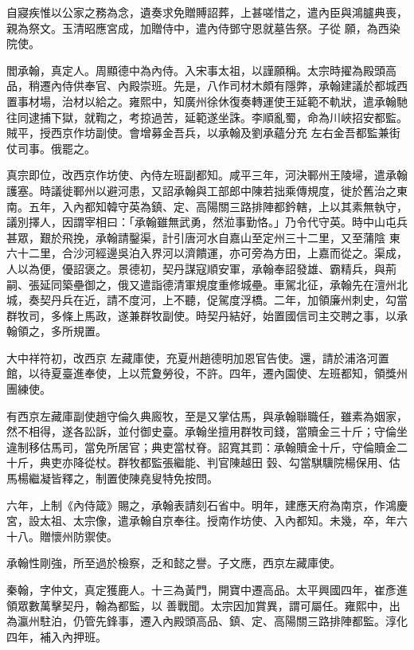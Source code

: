 \begin{pinyinscope}
 自寢疾惟以公家之務為念，遺奏求免贈賻詔葬，上甚嗟惜之，遣內臣與鴻臚典喪，親為祭文。玉清昭應宮成，加贈侍中，遣內侍鄧守恩就墓告祭。子從
 願，為西染院使。



 閻承翰，真定人。周顯德中為內侍。入宋事太祖，以謹願稱。太宗時擢為殿頭高品，稍遷內侍供奉官、內殿崇班。先是，八作司材木頗有隱弊，承翰建議於都城西置事材場，治材以給之。雍熙中，知廣州徐休復奏轉運使王延範不軌狀，遣承翰馳往同逮捕下獄，就鞫之，考掠過苦，延範遂坐誅。李順亂蜀，命為川峽招安都監。賊平，授西京作坊副使。會增募金吾兵，以承翰及劉承蘊分充
 左右金吾都監兼街仗司事。俄罷之。



 真宗即位，改西京作坊使、內侍左班副都知。咸平三年，河決鄆州王陵埽，遣承翰護塞。時議徙鄆州以避河患，又詔承翰與工部郎中陳若拙乘傳規度，徙於舊治之東南。五年，入內都知韓守英為鎮、定、高陽關三路排陣都鈐轄，上以其素無執守，議別擇人，因謂宰相曰：「承翰雖無武勇，然涖事勤恪。」乃令代守英。時中山屯兵甚眾，艱於飛挽，承翰請鑿渠，計引唐河水自嘉山至定州三十二里，又至蒲陰
 東六十二里，合沙河經邊吳泊入界河以濟饋運，亦可旁為方田，上嘉而從之。渠成，人以為便，優詔褒之。景德初，契丹謀寇順安軍，承翰奉詔發雄、霸精兵，與荊嗣、張延同築壘御之，俄又遣詣德清軍規度重修城壘。車駕北征，承翰先在澶州北城，奏契丹兵在近，請不度河，上不聽，促駕度浮橋。二年，加領廉州刺史，勾當群牧司，多條上馬政，遂兼群牧副使。時契丹結好，始置國信司主交聘之事，以承翰領之，多所規置。



 大中祥符初，改西京
 左藏庫使，充夏州趙德明加恩官告使。還，請於浦洛河置館，以待夏臺進奉使，上以荒夐勞役，不許。四年，遷內園使、左班都知，領獎州團練使。



 有西京左藏庫副使趙守倫久典廄牧，至是又掌估馬，與承翰聯職任，雖素為姻家，然不相得，遂各訟訴，並付御史臺。承翰坐擅用群牧司錢，當贖金三十斤；守倫坐違制移估馬司，當免所居官；典吏當杖脊。詔寬其罰：承翰贖金十斤，守倫贖金二十斤，典吏亦降從杖。群牧都監張繼能、判官陳越田
 瑴、勾當騏驥院楊保用、估馬楊繼凝皆釋之，制置使陳堯叟特免按問。



 六年，上制《內侍箴》賜之，承翰表請刻石省中。明年，建應天府為南京，作鴻慶宮，設太祖、太宗像，遣承翰自京奉往。授南作坊使、入內都知。未幾，卒，年六十八。贈懷州防禦使。



 承翰性剛強，所至過於檢察，乏和懿之譽。子文應，西京左藏庫使。



 秦翰，字仲文，真定獲鹿人。十三為黃門，開寶中遷高品。太平興國四年，崔彥進領眾數萬擊契丹，翰為都監，以
 善戰聞。太宗因加賞異，謂可屬任。雍熙中，出為瀛州駐泊，仍管先鋒事，遷入內殿頭高品、鎮、定、高陽關三路排陣都監。淳化四年，補入內押班。




\end{pinyinscope}
